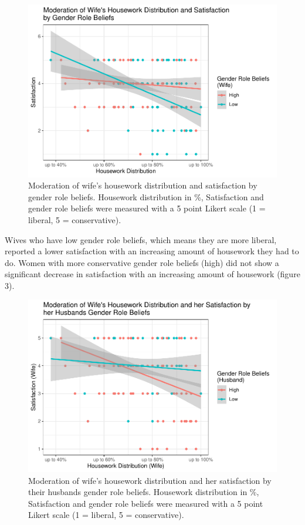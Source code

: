 \documentclass[
  man,floatsintext]{apa6}
\begin{document}
\begin{figure}
\centering
\includegraphics{results_files/figure-latex/unnamed-chunk-14-1.pdf}
\caption{\label{fig:unnamed-chunk-14}Moderation of wife's housework distribution and satisfaction by gender role beliefs. Housework distribution in \%, Satisfaction and gender role beliefs were measured with a 5 point Likert scale (1 = liberal, 5 = conservative).}
\end{figure}



Wives who have low gender role beliefs, which means they are more liberal, reported a lower satisfaction with an increasing amount of housework they had to do. Women with more conservative gender role beliefs (high) did not show a significant decrease in satisfaction with an increasing amount of housework (figure 3).

\begin{figure}
\centering
\includegraphics{results_files/figure-latex/unnamed-chunk-16-1.pdf}
\caption{\label{fig:unnamed-chunk-16}Moderation of wife's housework distribution and her satisfaction by their husbands gender role beliefs. Housework distribution in \%, Satisfaction and gender role beliefs were measured with a 5 point Likert scale (1 = liberal, 5 = conservative).}
\end{figure}
\end{document}
